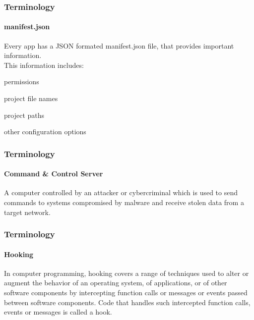 \documentclass[aspectratio=169]{beamer}
\begin{document}
\begin{frame}
  \frametitle{Terminology}
  \framesubtitle{manifest.json}
  \begin{center}
    \begin{tcolorbox}[title=\href{https://developer.chrome.com/apps/manifest}{manifest.json definition},colback=gray]
      Every app has a JSON formated manifest.json file, that provides important information.\\
      \newline
      This information includes:\\
      \begin{itemize}
      {\color{black}
      \item permissions
      \item project file names
      \item project paths
      \item other configuration options}
      \end{itemize}
    \end{tcolorbox}
  \end{center}
\end{frame}

\begin{frame}
  \frametitle{Terminology}
  \framesubtitle{Command \& Control Server}
  \begin{center}
    \begin{tcolorbox}[title=\href{https://en.wikipedia.org/wiki/Botnet}{Command and Control Server Definition},colback=gray]
      A computer controlled by an attacker or cybercriminal which is used to send commands to systems compromised by malware and receive stolen data from a target network.
    \end{tcolorbox}
  \end{center}
\end{frame}

\begin{frame}
  \frametitle{Terminology}
  \framesubtitle{Hooking}
  \begin{center}
    \begin{tcolorbox}[title=\href{https://en.wikipedia.org/wiki/Hooking}{Hooking Definition},colback=gray]
      In computer programming, hooking covers a range of techniques used to alter or augment the behavior of an operating system, of applications, or of other software components by intercepting function calls or messages or events passed between software components. Code that handles such intercepted function calls, events or messages is called a hook.
    \end{tcolorbox}
  \end{center}
\end{frame}
\end{document}
